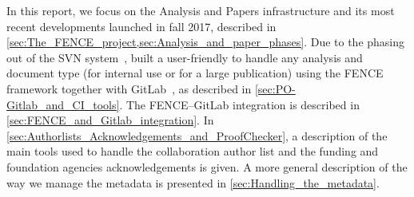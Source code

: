 In this report, we focus on the Analysis and Papers infrastructure and its most recent developments launched in fall 2017, described in \cref{sec:The_FENCE_project,sec:Analysis_and_paper_phases}.
Due to the phasing out of the SVN system~\cite{svn},  built a user-friendly  to handle any analysis and document type (for internal use or for a large publication) using the FENCE framework  together with GitLab~\cite{gitlab}, as described in \cref{sec:PO-Gitlab_and_CI_tools}.
The FENCE--GitLab integration is described in \cref{sec:FENCE_and_Gitlab_integration}. In \cref{sec:Authorlists_Acknowledgements_and_ProofChecker}, a description of the main tools used to handle the collaboration author list and the funding and foundation agencies acknowledgements is given.
A more general description of the way we manage the metadata is presented in \cref{sec:Handling_the_metadata}.
